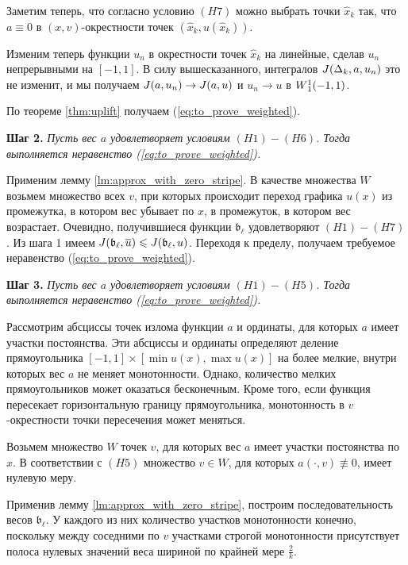 Заметим теперь, что согласно условию $(H7)$ можно выбрать точки $\hat{x}_k$ так,
что $a \equiv 0$ в $(x, v)$-окрестности точек $(\hat{x}_k, u(\hat{x}_k))$.

Изменим теперь функции $u_n$ в окрестности точек $\hat{x}_k$ на линейные,
сделав $u_n$ непрерывными на $[-1, 1]$.
В силу вышесказанного, интегралов $J(\Delta_k, a, u_n)$ это не изменит,
и мы получаем $J(a, u_n) \to J(a, u)$ и $u_n \to u$ в $W{}_1^1(-1, 1)$.

По теореме \ref{thm:uplift} получаем (\ref{eq:to_prove_weighted}).

\bigskip

\textbf{Шаг 2.}
\textit{Пусть вес $a$ удовлетворяет условиям $(H1)-(H6)$.
Тогда выполняется неравенство (\ref{eq:to_prove_weighted}).}

Применим лемму \ref{lm:approx_with_zero_stripe}.
В качестве множества $W$ возьмем множество всех $v$,
при которых происходит переход графика $u(x)$ из промежутка,
в котором вес убывает по $x$, в промежуток, в котором вес возрастает.
Очевидно, получившиеся функции $\mathfrak b_{\ell}$ удовлетворяют $(H1)-(H7)$.
Из шага 1 имеем $\IWg(\mathfrak b_{\ell}, \mon{u}) \le \IWg(\mathfrak b_{\ell}, u)$.
Переходя к пределу, получаем требуемое неравенство (\ref{eq:to_prove_weighted}).

\bigskip

\textbf{Шаг 3.}
\textit{Пусть вес $a$ удовлетворяет условиям $(H1)-(H5)$.
Тогда выполняется неравенство (\ref{eq:to_prove_weighted}).}

Рассмотрим абсциссы точек излома функции $a$ и ординаты, для которых $a$ имеет участки постоянства.
Эти абсциссы и ординаты определяют деление прямоугольника $[-1, 1] \times [\min u(x), \max u(x)]$
на более мелкие, внутри которых вес $a$ не меняет монотонности.
Однако, количество мелких прямоугольников может оказаться бесконечным.
Кроме того, если функция пересекает горизонтальную границу прямоугольника,
монотонность в $v$-окрестности точки пересечения может меняться.

Возьмем множество $W$ точек $v$, для которых вес $a$ имеет участки постоянства по $x$.
В соответствии с $(H5)$ множество $v \in W$, для которых $a(\cdot, v) \not\equiv 0$, имеет нулевую меру.

Применив лемму \ref{lm:approx_with_zero_stripe}, построим последовательность весов $\mathfrak b_{\ell}$.
У каждого из них количество участков монотонности конечно,
поскольку между соседними по $v$ участками строгой монотонности
присутствует полоса нулевых значений веса шириной по крайней мере $\frac{2}{k}$.

